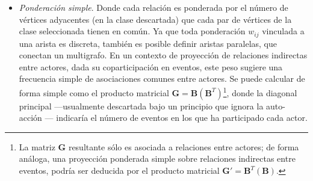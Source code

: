\documentclass[letterpaper, 11pt]{book}
\theoremstyle{definition}
\theoremstyle{remark}
\begin{document}
\begin{itemize}
    \setlength\itemsep{1em}
    \item \emph{Ponderación simple}. Donde cada relación es ponderada por el número de vértices adyacentes (en la clase descartada) que cada par de vértices de la clase seleccionada tienen en común. 
    Ya que toda ponderación $w_{ij}$ vinculada a una arista es discreta, también es posible definir aristas paralelas, que conectan un multigrafo. 
    En un contexto de proyección de relaciones indirectas entre actores, dada su coparticipación en eventos, este peso sugiere una frecuencia simple de asociaciones comunes entre actores. 
    Se puede calcular de forma simple como el producto matricial $\mathbf{G} = \mathbf{B}(\mathbf{B}^{T})$\footnote{
	La matriz $\mathbf{G}$ resultante sólo es asociada a relaciones entre actores; de forma análoga, una proyección ponderada simple sobre relaciones indirectas entre eventos, podría ser deducida por el producto matricial $\mathbf{G'} = \mathbf{B}^{T}(\mathbf{B})$.
    }, 
    donde la diagonal principal ---usualmente descartada bajo un principio que ignora la auto-acción \citep[87]{1988_Breiger_Bipartite}--- indicaría el número de eventos en los que ha participado cada actor. 
    
    
    

\end{itemize}
\end{document}
